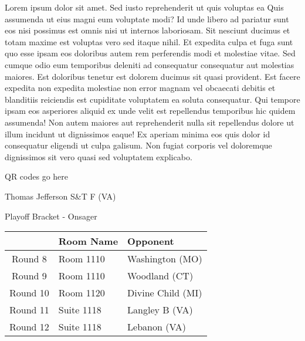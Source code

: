 \documentclass{article}%
\begin{document}
\vspace*{8pt}%
\linebreak%
\newline%
\newline%
Lorem ipsum dolor sit amet. Sed iusto reprehenderit ut quis voluptas ea Quis assumenda ut eius magni eum voluptate modi? Id unde libero ad pariatur sunt eos nisi possimus est omnis nisi ut internos laboriosam. Sit nesciunt ducimus et totam maxime est voluptas vero sed itaque nihil. Et expedita culpa et fuga sunt quo esse ipsam eos doloribus autem rem perferendis modi et molestiae vitae.\newline%
\newline%
Sed cumque odio eum temporibus deleniti ad consequatur consequatur aut molestias maiores. Est doloribus tenetur est dolorem ducimus sit quasi provident. Est facere expedita non expedita molestiae non error magnam vel obcaecati debitis et blanditiis reiciendis est cupiditate voluptatem ea soluta consequatur. Qui tempore ipsam eos asperiores aliquid ex unde velit est repellendus temporibus hic quidem assumenda!\newline%
\newline%
Non autem maiores aut reprehenderit nulla sit repellendus dolore ut illum incidunt ut dignissimos eaque! Ex aperiam minima eos quis dolor id consequatur eligendi ut culpa galisum. Non fugiat corporis vel doloremque dignissimos sit vero quasi sed voluptatem explicabo.\newline%
\newline%
%
\vspace*{30pt}%
\begin{center}%
\begin{Huge}%
QR codes go here%
\end{Huge}%
\end{center}%
\newpage%
\begin{center}%
\begin{Huge}%
Thomas Jefferson S\&T F (VA)%
\end{Huge}%
\vspace*{8pt}%
\linebreak%
\begin{Large}%
Playoff Bracket {-} Onsager%
\end{Large}%
\end{center}%
%
\begin{tabularx}{\textwidth}{|c|Y|Y|}%
\hline%
&Room Name&Opponent\\%
\hline%
Round 8&Room 1110&Washington (MO)\\%
Round 9&Room 1110&Woodland (CT)\\%
Round 10&Room 1120&Divine Child (MI)\\%
Round 11&Suite 1118&Langley B (VA)\\%
Round 12&Suite 1118&Lebanon (VA)\\%
\hline%
\end{tabularx}%
\end{document}
